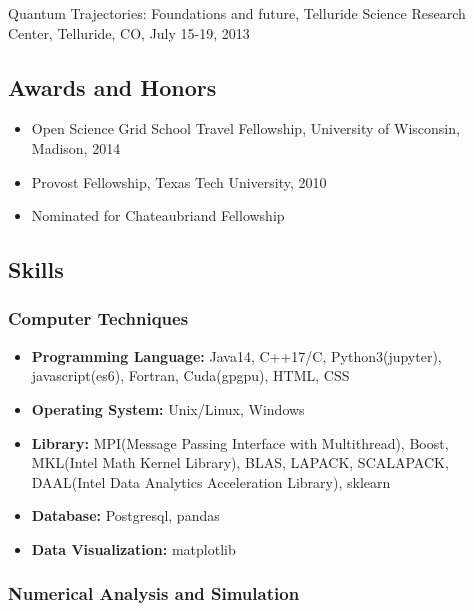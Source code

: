 \documentclass[
]{article}
\providecommand{\tightlist}{%
  \setlength{\itemsep}{0pt}\setlength{\parskip}{0pt}}
\begin{document}
Quantum Trajectories: Foundations and future, Telluride Science Research
Center, Telluride, CO, July 15-19, 2013

\hypertarget{awards-and-honors}{%
\subsection{Awards and Honors}\label{awards-and-honors}}

\begin{itemize}
\tightlist
\item
  Open Science Grid School Travel Fellowship, University of Wisconsin,
  Madison, 2014
\item
  Provost Fellowship, Texas Tech University, 2010
\item
  Nominated for Chateaubriand Fellowship
\end{itemize}

\hypertarget{skills}{%
\subsection{Skills}\label{skills}}

\hypertarget{computer-techniques}{%
\subsubsection{Computer Techniques}\label{computer-techniques}}

\begin{itemize}
\tightlist
\item
  \textbf{Programming Language:} Java14, C++17/C, Python3(jupyter),
  javascript(es6), Fortran, Cuda(gpgpu), HTML, CSS
\item
  \textbf{Operating System:} Unix/Linux, Windows
\item
  \textbf{Library:} MPI(Message Passing Interface with Multithread),
  Boost, MKL(Intel Math Kernel Library), BLAS, LAPACK, SCALAPACK,
  DAAL(Intel Data Analytics Acceleration Library), sklearn
\item
  \textbf{Database:} Postgresql, pandas
\item
  \textbf{Data Visualization:} matplotlib
\end{itemize}

\hypertarget{numerical-analysis-and-simulation}{%
\subsubsection{Numerical Analysis and
Simulation}\label{numerical-analysis-and-simulation}}
\end{document}
